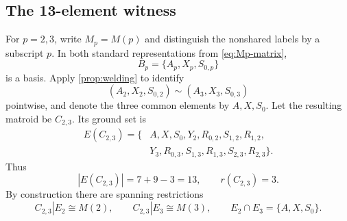 \documentclass[11pt]{article}
\theoremstyle{definition}
\begin{document}
\subsection{The 13-element witness}\label{subsec:c23}

For $p=2,3$, write $M_p=M(p)$ and distinguish the nonshared labels by a subscript $p$.  In both standard representations from \eqref{eq:Mp-matrix},
\[
B_p=\{A_p,X_p,S_{0,p}\}
\]
is a basis.  Apply \cref{prop:welding} to identify
\[
(A_2,X_2,S_{0,2})\sim(A_3,X_3,S_{0,3})
\]
pointwise, and denote the three common elements by $A,X,S_0$.  Let the resulting matroid be $C_{2,3}$.  Its ground set is
\[
\begin{aligned}
E(C_{2,3})=\{&A,X,S_0,
Y_2,R_{0,2},S_{1,2},R_{1,2},\\
&Y_3,R_{0,3},S_{1,3},R_{1,3},S_{2,3},R_{2,3}\}.
\end{aligned}
\]
Thus
\begin{equation}\label{eq:C23-size}
|E(C_{2,3})|=7+9-3=13,
\qquad r(C_{2,3})=3.
\end{equation}
By construction there are spanning restrictions
\begin{equation}\label{eq:C23-restrictions}
C_{2,3}|E_2\cong M(2),
\qquad
C_{2,3}|E_3\cong M(3),
\qquad
E_2\cap E_3=\{A,X,S_0\}.
\end{equation}
\end{document}
